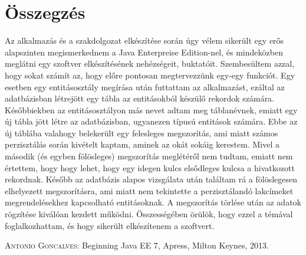 \documentclass[centeredchapter]{thesis-ekf}
\theoremstyle{definition}
\theoremstyle{remark}
\begin{document}



\chapter{Összegzés}

Az alkalmazás és a szakdolgozat elkészítése során úgy vélem sikerült egy erős alapszinten megismerkednem a Java Enterpreise Edition-nel, és mindeközben meglátni egy szoftver elkészítésének nehézségeit, buktatóit. Szembesültem azzal, hogy sokat számít az, hogy előre pontosan megtervezzünk egy-egy funkciót. Egy esetben egy entitásosztály megírása után futtattam az alkalmazást, ezáltal az adatbázisban létrejött egy tábla az entitásokból készülő rekordok számára. Későbbiekben az entitásosztályon más nevet adtam meg táblanévnek, emiatt egy új tábla jött létre az adatbázisban, ugyanezen típusú entitások számára. Ebbe az új táblába valahogy belekerült egy felesleges megszorítás, ami miatt számos perzisztálás során kivételt kaptam, aminek az okát sokáig kerestem. Mivel a második (és egyben fölösleges) megszorítás meglétéről nem tudtam, emiatt nem értettem, hogy hogy lehet, hogy egy idegen kulcs elsődleges kulcsa a hivatkozott rekordnak. Később az adatbázis alapos vizsgálata után találtam rá a fölöslegesen elhelyezett megszorításra, ami miatt nem tekintette a perzisztálandó lakcímeket megrendelésekhez kapcsolható entitásoknak. A megszorítás törlése után az adatok rögzítése kiválóan kezdett működni.
Összességében örülök, hogy ezzel a témával foglalkozhattam, és hogy sikerült elkészítenem a szoftvert.


\begin{thebibliography}{1}
 \textsc{Antonio Goncalves}: Beginning Java EE 7, Apress, Milton Keynes, 2013.
\end{thebibliography}
\end{document}
